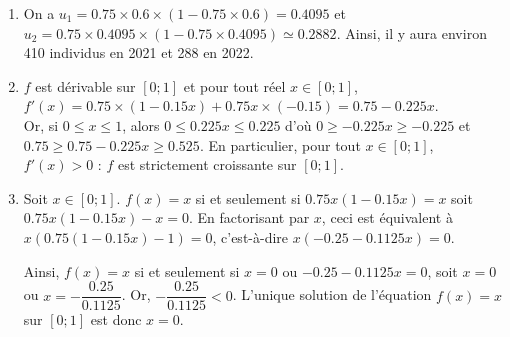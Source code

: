 \documentclass[11pt,fleqn, openany]{book} %
\begin{document}
\begin{solution}\hspace{0pt}
\begin{enumerate}
\item On a $u_1=0.75 \times 0.6 \times (1-0.75 \times 0.6) = 0.4095$ et $u_2=0.75 \times 0.4095 \times (1-0.75 \times 0.4095) \simeq 0.2882$. Ainsi, il y aura environ 410 individus en 2021 et 288 en 2022.

\item $f$ est dérivable sur $[0;1]$ et pour tout réel $x\in[0;1]$, $f'(x)=0.75 \times(1-0.15x)+0.75x \times (-0.15) = 0.75-0.225x$.\\
Or, si $0 \leqslant x \leqslant 1$, alors $0 \leqslant 0.225x \leqslant 0.225$ d'où $0\geqslant -0.225x \geqslant -0.225$ et $0.75 \geqslant 0.75-0.225x \geqslant 0.525$. En particulier, pour tout $x\in[0;1]$, $f'(x) > 0$ : $f$ est strictement croissante sur $[0;1]$.

\begin{center}
\end{center}


\item Soit $x \in [0;1]$. $f(x)=x$ si et seulement si $0.75x(1-0.15x)=x$ soit $0.75x(1-0.15x)-x=0$. En factorisant par $x$, ceci est équivalent à $x(0.75(1-0.15x)-1)=0$, c'est-à-dire $x(-0.25-0.1125x)=0$.

Ainsi, $f(x)=x$ si et seulement si $x=0$ ou $-0.25-0.1125x = 0$, soit $x=0$ ou $x=-\dfrac{0.25}{0.1125}$. Or, $-\dfrac{0.25}{0.1125}<0$. L'unique solution de l'équation $f(x)=x$ sur $[0;1]$ est donc $x=0$.


\end{enumerate}
\end{solution}
\end{document}
